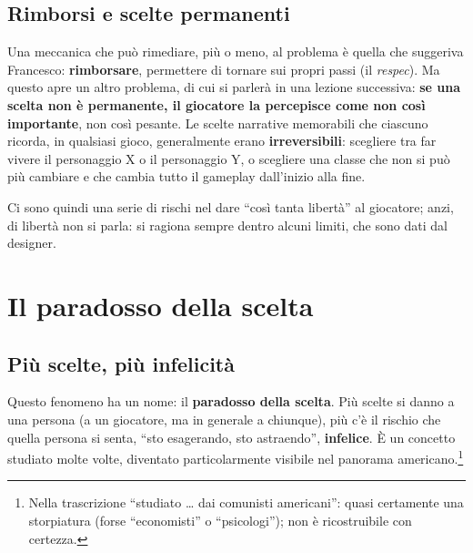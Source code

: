 \subsection{Rimborsi e scelte permanenti}

Una meccanica che può rimediare, più o meno, al problema è quella che
suggeriva Francesco: \textbf{rimborsare}, permettere di tornare sui propri
passi (il \emph{respec}). Ma questo apre un altro problema, di cui si parlerà
in una lezione successiva: \textbf{se una scelta non è permanente, il
giocatore la percepisce come non così importante}, non così pesante. Le scelte
narrative memorabili che ciascuno ricorda, in qualsiasi gioco, generalmente
erano \textbf{irreversibili}: scegliere tra far vivere il personaggio X o il
personaggio Y, o scegliere una classe che non si può più cambiare e che
cambia tutto il gameplay dall'inizio alla fine.

Ci sono quindi una serie di rischi nel dare ``così tanta libertà'' al
giocatore; anzi, di libertà non si parla: si ragiona sempre dentro alcuni
limiti, che sono dati dal designer.

\section{Il paradosso della scelta}
\label{gd9:sec:paradosso}



\subsection{Più scelte, più infelicità}

Questo fenomeno ha un nome: il \textbf{paradosso della scelta}. Più scelte si
danno a una persona (a un giocatore, ma in generale a chiunque), più c'è il
rischio che quella persona si senta, ``sto esagerando, sto astraendo'',
\textbf{infelice}. È un concetto studiato molte volte, diventato
particolarmente visibile nel panorama americano.\footnote{Nella trascrizione
``studiato \ldots{} dai comunisti americani'': quasi certamente una
storpiatura (forse ``economisti'' o ``psicologi''); non è ricostruibile con
certezza.}

